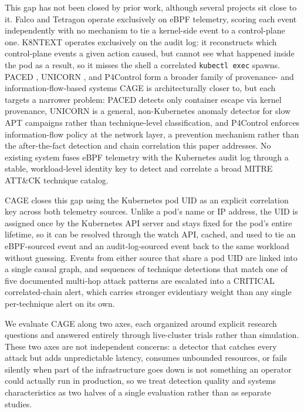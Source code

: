 \documentclass{ieeeaccess}
\begin{document}
This gap has not been closed by prior work, although several projects
sit close to it. Falco and Tetragon operate exclusively on eBPF
telemetry, scoring each event independently with no mechanism to tie a
kernel-side event to a control-plane one. K8NTEXT operates exclusively
on the audit log: it reconstructs which control-plane events a given
action caused, but cannot see what happened inside the pod as a
result, so it misses the shell a correlated \texttt{kubectl exec} spawns. PACED
\cite{ref4}, UNICORN \cite{ref5}, and P4Control \cite{ref8} form a broader family of
provenance- and information-flow-based systems CAGE is architecturally
closer to, but each targets a narrower problem: PACED detects only
container escape via kernel provenance, UNICORN is a general,
non-Kubernetes anomaly detector for slow APT campaigns rather than
technique-level classification, and P4Control enforces
information-flow policy at the network layer, a prevention mechanism
rather than the after-the-fact detection and chain correlation this
paper addresses. No existing system fuses eBPF telemetry with the
Kubernetes audit log through a stable, workload-level identity key to
detect and correlate a broad MITRE ATT\&CK technique catalog.

CAGE closes this gap using the Kubernetes pod UID as an explicit
correlation key across both telemetry sources. Unlike a pod's name or
IP address, the UID is assigned once by the Kubernetes API server and
stays fixed for the pod's entire lifetime, so it can be resolved
through the watch API, cached, and used to tie an eBPF-sourced event and
an audit-log-sourced event back to the same workload without guessing.
Events from either source that share a pod UID are linked into a single
causal graph, and sequences of technique detections that match one of
five documented multi-hop attack patterns are escalated into a CRITICAL
correlated-chain alert, which carries stronger evidentiary weight than
any single per-technique alert on its own.

We evaluate CAGE along two axes, each organized around explicit
research questions and answered entirely through live-cluster trials
rather than simulation. These two axes are not independent concerns: a
detector that catches every attack but adds unpredictable latency,
consumes unbounded resources, or fails silently when part of the
infrastructure goes down is not something an operator could actually
run in production, so we treat detection quality and systems
characteristics as two halves of a single evaluation rather than as
separate studies.
\end{document}
